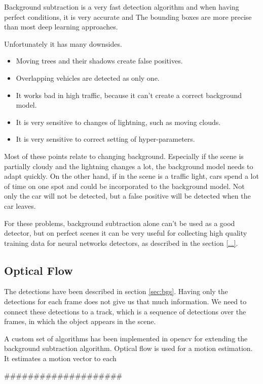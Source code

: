 \documentclass[a4paper,12pt,titlepage, twoside]{article}
\numberwithin{figure}{section}
\begin{document}
Background subtraction is a very fast detection algorithm and when having perfect conditions, it is very accurate and The bounding boxes are more precise than most deep learning approaches.

Unfortunately it has many downsides. 

\begin{itemize}
\item Moving trees and their shadows create false positives.
\item Overlapping vehicles are detected as only one.
\item It works bad in high traffic, because it can't create a correct background model.
\item It is very sensitive to changes of lightning, such as moving clouds.
\item It is very sensitive to correct setting of hyper-parameters.
\end{itemize}

Most of these points relate to changing background. Especially if the scene is partially cloudy and the lightning changes a lot, the background model needs to adapt quickly. On the other hand, if in the scene is a traffic light, cars spend a lot of time on one spot and could be incorporated to the background model. Not only the car will not be detected, but a false positive will be detected when the car leaves.

For these problems, background subtraction alone can't be used as a good detector, but on perfect scenes  it can be very useful for collecting high quality training data for neural networks detectors, as described in the section \ref{...}.

\subsection{Optical Flow}

The detections have been described in section \ref{sec:bgs}. Having only the detections for each frame does not give us that much information. We need to connect these detections to a track, which is a sequence of detections over the frames, in which the object appears in the scene.

A custom set of algorithms has been implemented in opencv\cite{opencv} for extending the background subtraction algorithm. Optical flow \cite{optical-flow} is used for a motion estimation. It estimates a motion vector to each 

####################
\end{document}

